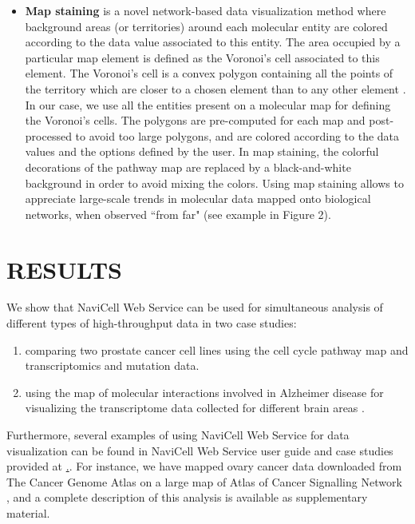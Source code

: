 \documentclass[a4,center,fleqn]{NAR}
\begin{document}
\begin{itemize}
\item \textbf{Map staining} is a novel network-based data visualization method where
background areas (or territories) around each molecular entity are colored according to the data
value associated to this entity. The area occupied by a particular map element is defined as the Voronoi's cell
associated to this element. The Voronoi's cell is a convex polygon containing all the points
of the territory which are closer to a chosen element than to any other element
\cite{aurenhammer1991voronoi}. In our case, we use all the entities present on a molecular map
for defining the Voronoi's cells. The polygons are pre-computed for each map and post-processed
to avoid too large polygons, and are colored according to the data values and the options
defined by the user. In map staining, the colorful decorations of the pathway map
are replaced by a black-and-white background in order to avoid mixing the colors.
Using map staining allows to appreciate large-scale trends in molecular data mapped
onto biological networks, when observed ``from far" (see example in Figure 2).

\end{itemize}



\section{RESULTS}

We show that NaviCell Web Service can be used for simultaneous analysis of
different types of high-throughput data in two case studies:
\begin{enumerate}
\item comparing two prostate cancer cell lines using the cell cycle pathway map
and transcriptomics and mutation data.

\item using the map of molecular interactions involved in Alzheimer disease
\cite{Mizuno2012} for visualizing the transcriptome data collected for
different brain areas \cite{Hokama2014}.
\end{enumerate}

Furthermore, several examples of using NaviCell Web Service for data
visualization can be found in NaviCell Web Service user guide and case studies
provided at \href{http://navicell.curie.fr/pages/nav\_web\_service.html}.. For
instance, we have mapped ovary cancer data downloaded from The Cancer Genome
Atlas \cite{TCGA2011Ovarian} on a  large map of Atlas of Cancer Signalling
Network \cite{Kuperstein2015}, and a complete description of this analysis is
available as supplementary material. 
\end{document}

